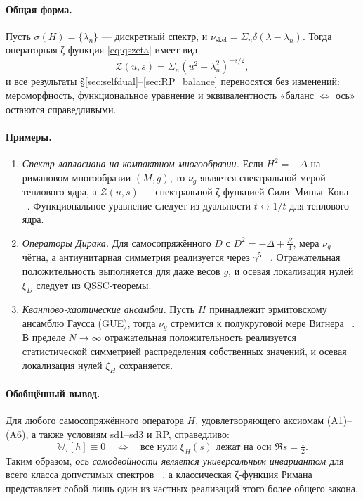 \documentclass{article}
\numberwithin{equation}{section}
\theoremstyle{plain}
\theoremstyle{definition}
\theoremstyle{remark}
\def\Leftrightarrow{⇔}%
\def\leftrightarrow{↔}%
\def\delta{δ}\def\Delta{Δ}\def\epsilon{ε}\def\zeta{ζ}%
\def\infty{∞}\def\partial{∂}\def\sum{Σ}\def\int{∫}%
\begin{document}
\paragraph{Общая форма.}
Пусть $\sigma(H)=\{\lambda_n\}$ — дискретный спектр,
и $\nu_{\mathrm{skel}}=\sum_n \delta(\lambda-\lambda_n)$.
Тогда операторная ζ-функция \eqref{eq:qszeta} имеет вид
\begin{equation}
\label{eq:general_Z}
\mathcal Z(u,s)=\sum_n (u^2+\lambda_n^2)^{-s/2},
\end{equation}
и все результаты §\ref{sec:selfdual}–\ref{sec:RP_balance} переносятся без изменений:
мероморфность, функциональное уравнение и эквивалентность «баланс $\Leftrightarrow$ ось»
остаются справедливыми.

\paragraph{Примеры.}
\begin{enumerate}[label=(\alph*),leftmargin=2.4em]
  \item \emph{Спектр лапласиана на компактном многообразии.}
  Если $H^2=-\Delta$ на римановом многообразии $(M,g)$, то
  $\nu_g$ является спектральной мерой теплового ядра,
  а $\mathcal Z(u,s)$ --- спектральной ζ-функцией Сили–Минья–Кона ~\cite{Minakshisundaram1949} ~\cite{Gilkey1995}.
  Функциональное уравнение следует из дуальности $t\leftrightarrow 1/t$
  для теплового ядра.

  \item \emph{Операторы Дирака.}
  Для самосопряжённого $D$ с $D^2=-\Delta+\frac{R}{4}$,
  мера $\nu_g$ чётна, а антиунитарная симметрия реализуется через $\gamma^5$ ~\cite{Thaller1992}.
  Отражательная положительность выполняется для даже весов $g$,
  и осевая локализация нулей $\xi_D$ следует из QSSC-теоремы.

  \item \emph{Квантово-хаотические ансамбли.}
  Пусть $H$ принадлежит эрмитовскому ансамблю Гаусса (GUE),
  тогда $\nu_g$ стремится к полукруговой мере Вигнера ~\cite{Mehta2004}.
  В пределе $N\to\infty$ отражательная положительность реализуется
  статистической симметрией распределения собственных значений,
  и осевая локализация нулей $\xi_H$ сохраняется.
\end{enumerate}

\paragraph{Обобщённый вывод.}
Для любого самосопряжённого оператора $H$,
удовлетворяющего аксиомам (A1)–(A6), а также условиям sd1–sd3 и RP,
справедливо:
\begin{equation}
\label{eq:general_balance_axis}
\mathbb W_\tau[h]\equiv 0
\quad\Longleftrightarrow\quad
\text{все нули } \xi_H(s) \text{ лежат на оси } \Re s=\tfrac12.
\end{equation}
Таким образом, \emph{ось самодвойности является универсальным инвариантом}
для всего класса допустимых спектров ~\cite{Weyl1911}, а классическая ζ-функция Римана
представляет собой лишь один из частных реализаций этого более общего закона.
\end{document}
